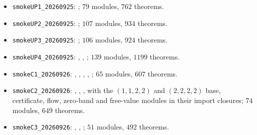 \begin{itemize}
\item \texttt{smokeUP1\_20260925}: ; $79$ modules, $762$ theorems.
\item \texttt{smokeUP2\_20260925}: ; $107$ modules, $934$ theorems.
\item \texttt{smokeUP3\_20260925}: ; $106$ modules, $924$ theorems.
\item \texttt{smokeUP4\_20260925}: , ,
; $139$ modules, $1199$ theorems.
\item \texttt{smokeC1\_20260926}: , ,
, , ;
$65$ modules, $607$ theorems.
\item \texttt{smokeC2\_20260926}: , ,
, with the $(1,1,2,2)$ and $(2,2,2,2)$ base, certificate, flow,
zero-band and free-value modules in their import closures; $74$ modules, $649$ theorems.
\item \texttt{smokeC3\_20260926}: , ,
; $51$ modules, $492$ theorems.
\end{itemize}


